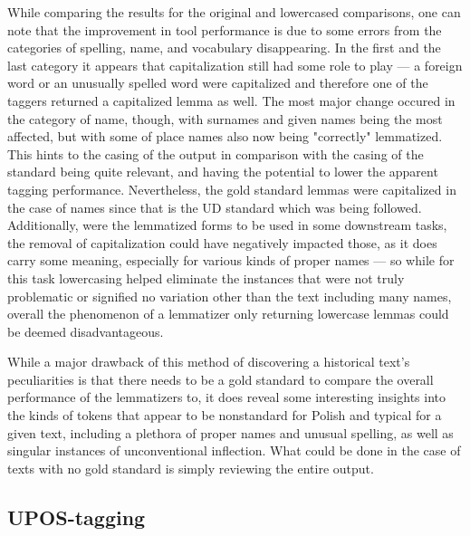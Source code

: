 While comparing the results for the original and lowercased comparisons, one can note that the improvement in tool performance is due to some errors from the categories of spelling, name, and vocabulary disappearing. In the first and the last category it appears that capitalization still had some role to play --- a foreign word or an unusually spelled word were capitalized and therefore one of the taggers returned a capitalized lemma as well. The most major change occured in the category of name, though, with surnames and given names being the most affected, but with some of place names also now being "correctly" lemmatized. This hints to the casing of the output in comparison with the casing of the standard being quite relevant, and having the potential to lower the apparent tagging performance. Nevertheless, the gold standard lemmas were capitalized in the case of names since that is the UD standard which was being followed. Additionally, were the lemmatized forms to be used in some downstream tasks, the removal of capitalization could have negatively impacted those, as it does carry some meaning, especially for various kinds of proper names --- so while for this task lowercasing helped eliminate the instances that were not truly problematic or signified no variation other than the text including many names, overall the phenomenon of a lemmatizer only returning lowercase lemmas could be deemed disadvantageous.

While a major drawback of this method of discovering a historical text's peculiarities is that there needs to be a gold standard to compare the overall performance of the lemmatizers to, it does reveal some interesting insights into the kinds of tokens that appear to be nonstandard for Polish and typical for a given text, including a plethora of proper names and unusual spelling, as well as singular instances of unconventional inflection. What could be done in the case of texts with no gold standard is simply reviewing the entire output.

\subsection{UPOS-tagging}
\label{subsec:upos-tagging}

